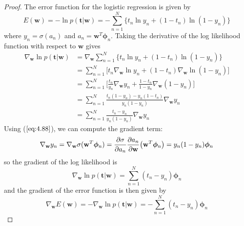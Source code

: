 \vspace{1em}

\begin{proof}
    The error function for the logistic regression is given by
    \begin{equation}\label{eq:4.90}\tag{4.90}
        E(\mathbf{w}) 
        = -\ln p(\mathbf{t} | \mathbf{w})
        = -\sum_{n = 1}^{N} \{t_n \ln y_n + (1 - t_n) \ln(1 - y_n)\} 
    \end{equation}
    where $y_n = \sigma(a_n)$ and $a_n = \mathbf{w}^T\bm{\phi}_n$.
    Taking the derivative of the log likelihood function with respect to $\mathbf{w}$
    gives
    \begin{align*}
        \nabla_{\mathbf{w}} \ln p(\mathbf{t} | \mathbf{w})
        &= \nabla_{\mathbf{w}} \sum_{n=1}^{N} \big\{
            t_n \ln y_n 
            + (1 - t_n) \ln (1 - y_n)
            \big\} \\
        &= \sum_{n=1}^{N} \bigg[t_n \nabla_{\mathbf{w}} \ln y_n
            + (1 - t_n) \nabla_{\mathbf{w}} \ln (1 - y_n)\bigg] \\
        &= \sum_{n=1}^{N} \bigg[\frac{t_n}{y_n} \nabla_{\mathbf{w}} y_n
            + \frac{1 - t_n}{1 - y_n} \nabla_{\mathbf{w}} (1 - y_n) \bigg]\\
        &= \sum_{n=1}^{N} \frac{t_n(1 - y_n) - y_n(1 - t_n)}{y_n(1 - y_n)}
            \nabla_\mathbf{w} y_n \\
        &= \sum_{n=1}^{N} \frac{t_n - y_n}{y_n(1 - y_n)}
            \nabla_\mathbf{w} y_n \label{eq:4.13.1}\tag{4.13.1}
    \end{align*}
    Using ($\ref{eq:4.88}$), we can compute the gradient term:
    \begin{align*}
        \nabla_{\mathbf{w}} y_n 
        = \nabla_\mathbf{w} \sigma(\mathbf{w}^T\bm{\phi}_n)
        = \pdv{\sigma}{a_n} \pdv{a_n}{\mathbf{w}} \big(\mathbf{w}^T\bm{\phi}_n\big)
        = y_n(1 - y_n) \bm{\phi}_n
    \end{align*}
    so the gradient of the log likelihood is
    \[
        \nabla_{\mathbf{w}} \ln p(\mathbf{t} | \mathbf{w})
        = \sum_{n=1}^{N} (t_n - y_n) \bm{\phi}_n
    \] 
    and the gradient of the error function is then given by
    \begin{equation}\label{eq:4.91}\tag{4.91}
        \nabla_\mathbf{w} E(\mathbf{w})
        = -\nabla_\mathbf{w} \ln p(\mathbf{t} | \mathbf{w})
        = - \sum_{n=1}^{N} (t_n - y_n) \bm{\phi}_n
    \end{equation}
\end{proof}

